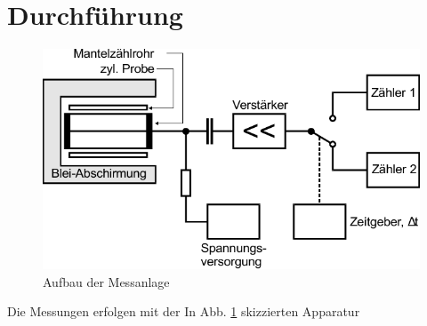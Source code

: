 \section{Durchführung}
\begin{figure}
    \centering
    \includegraphics{Abbildungen/Schaltplan.pdf}
    \caption{Aufbau der Messanlage \cite{man:v702}}
    \label{fig:Aufbau}
\end{figure}
Die Messungen erfolgen mit der In Abb. \ref{fig:Aufbau} skizzierten Apparatur